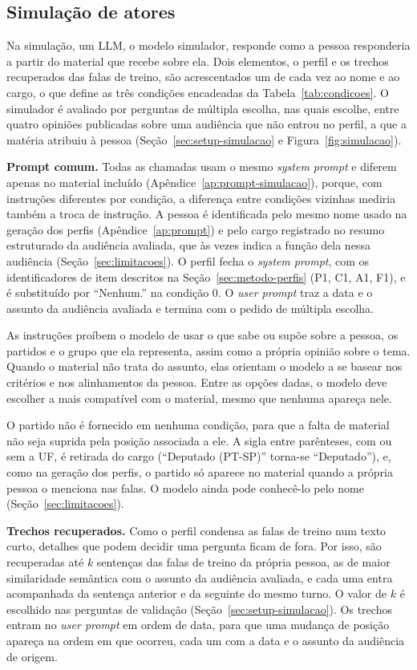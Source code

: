 \subsection{Simulação de atores}
\label{sec:metodo-simulacao}

Na simulação, um LLM, o modelo simulador, responde como a pessoa responderia a partir do material
que recebe sobre ela. Dois elementos, o perfil e os trechos recuperados das falas de treino, são
acrescentados um de cada vez ao nome e ao cargo, o que define as três condições encadeadas da
Tabela~\ref{tab:condicoes}. O simulador é avaliado por perguntas de múltipla escolha, nas quais
escolhe, entre quatro opiniões publicadas sobre uma audiência que não entrou no perfil, a que a
matéria atribuiu à pessoa (Seção~\ref{sec:setup-simulacao} e Figura~\ref{fig:simulacao}).



\textbf{Prompt comum.} Todas as chamadas usam o mesmo \textit{system prompt} e diferem apenas no
material incluído (Apêndice~\ref{ap:prompt-simulacao}), porque, com instruções diferentes por
condição, a diferença entre condições vizinhas mediria também a troca de instrução. A pessoa é
identificada pelo mesmo nome usado na geração dos perfis (Apêndice~\ref{ap:prompt}) e pelo cargo
registrado no resumo estruturado da audiência avaliada, que às vezes indica a função dela nessa
audiência (Seção~\ref{sec:limitacoes}). O perfil fecha o \textit{system prompt}, com os
identificadores de item descritos na Seção~\ref{sec:metodo-perfis} (P1, C1, A1, F1), e é
substituído por ``Nenhum.'' na condição 0. O \textit{user prompt} traz a data e o assunto da
audiência avaliada e termina com o pedido de múltipla escolha.

As instruções proíbem o modelo de usar o que sabe ou supõe sobre a pessoa, os partidos e o grupo que
ela representa, assim como a própria opinião sobre o tema. Quando o material não trata do assunto,
elas orientam o modelo a se basear nos critérios e nos alinhamentos da pessoa. Entre as opções
dadas, o modelo deve escolher a mais compatível com o material, mesmo que nenhuma apareça nele.

O partido não é fornecido em nenhuma condição, para que a falta de material não seja suprida pela
posição associada a ele. A sigla entre parênteses, com ou sem a UF, é retirada do cargo (``Deputado
(PT-SP)'' torna-se ``Deputado''), e, como na geração dos perfis, o partido só aparece no material
quando a própria pessoa o menciona nas falas. O modelo ainda pode conhecê-lo pelo nome
(Seção~\ref{sec:limitacoes}).

\textbf{Trechos recuperados.} Como o perfil condensa as falas de treino num texto curto, detalhes
que podem decidir uma pergunta ficam de fora. Por isso, são recuperadas até $k$ sentenças das falas
de treino da própria pessoa, as de maior similaridade semântica com o assunto da audiência avaliada,
e cada uma entra acompanhada da sentença anterior e da seguinte do mesmo turno. O valor de $k$ é
escolhido nas perguntas de validação (Seção~\ref{sec:setup-simulacao}). Os trechos entram no
\textit{user prompt} em ordem de data, para que uma mudança de posição apareça na ordem em que
ocorreu, cada um com a data e o assunto da audiência de origem.
